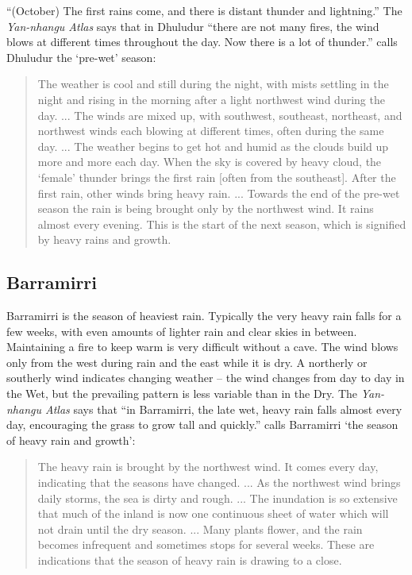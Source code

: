 ``(October) The first rains come, and there is distant thunder and lightning.'' \citep{barber2005}
The \textit{Yan-nhangu Atlas} says that in Dhuludur ``there are not many
fires, the wind blows at different times throughout the day. Now there is
a lot of thunder.''  \citet{davis1989} calls Dhuludur the `pre-wet' season:
\begin{quote}
    The weather is cool and still during the night, with mists settling in the night
    and rising in the morning after a light northwest wind during the day. ...
    The winds are mixed up, with southwest, southeast, northeast, and northwest winds
    each blowing at different times, often during the same day. ...
    The weather begins to get hot and humid as the clouds build up more and more each day.
    When the sky is covered by heavy cloud, the `female' thunder brings
    the first rain [often from the southeast].
    After the first rain, other winds bring heavy rain.
    ...
    Towards the end of the pre-wet season the rain is being brought only by the northwest wind.
    It rains almost every evening.
    This is the start of the next season, which is signified by heavy rains and growth.
\end{quote}


\subsection{Barramirri}
Barramirri is the season of heaviest rain.  Typically the
very heavy rain falls for a few weeks, with even amounts of lighter rain
and clear skies in between.  Maintaining a fire to keep warm is very
difficult without a cave.  The wind blows only from the west during rain
and the east while it is dry.  A northerly or southerly wind indicates
changing weather -- the wind changes from day to day in the Wet, but the
prevailing pattern is less variable than in the Dry.
%
The \textit{Yan-nhangu Atlas} says that ``in Barramirri, the late wet,
heavy rain falls almost every day, encouraging the grass to grow tall
and quickly.''
%
\citet{davis1989} calls Barramirri `the season of heavy rain and growth':
\begin{quote}
    The heavy rain is brought by the northwest wind. It comes every day,
    indicating that the seasons have changed. ... As the northwest wind
    brings daily storms, the sea is dirty and rough. ... The inundation
    is so extensive that much of the inland is now one continuous sheet
    of water which will not drain until the dry season. ...
    Many plants flower, and the rain becomes infrequent and sometimes
    stops for several weeks.  These are indications that the season of
    heavy rain is drawing to a close.
\end{quote}


